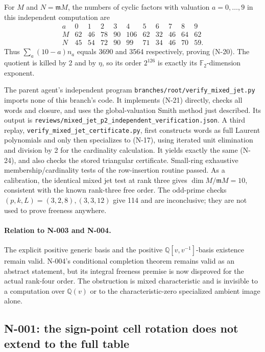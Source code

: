 For $M$ and $N=\mathfrak mM$, the numbers of cyclic factors with
valuation $a=0,\ldots,9$ in this independent computation are
\[
\begin{array}{c|rrrrrrrrrr}
a&0&1&2&3&4&5&6&7&8&9\\\hline
M&62&46&78&90&106&62&32&46&64&62\\
N&45&54&72&90&99&71&34&46&70&59.
\end{array}
\tag{N-24}
\]
Thus $\sum_a(10-a)n_a$ equals 3690 and 3564 respectively, proving
(N-20).  The quotient is killed by 2 and by $\eta$, so its order
$2^{126}$ is exactly its $\mathbb F_2$-dimension exponent.

The parent agent's independent program
\nolinkurl{branches/root/verify_mixed_jet.py} imports none of this
branch's code.  It implements (N-21) directly, checks all words and
closure, and uses the global-valuation Smith method just described.
Its output is
\nolinkurl{reviews/mixed_jet_p2_independent_verification.json}.
A third replay, \nolinkurl{verify_mixed_jet_certificate.py}, first
constructs words as full Laurent polynomials and only then specializes
to (N-17), using iterated unit elimination and division by 2 for the
cardinality calculation.  It yields exactly the same (N-24), and
also checks the stored triangular certificate.  Small-ring exhaustive
membership/cardinality tests of the row-insertion routine passed.
As a calibration, the identical mixed jet test at rank three gives
$\dim M/\mathfrak mM=10$, consistent with the known rank-three free
order.  The odd-prime checks $(p,k,L)=(3,2,8),(3,3,12)$ give 114 and
are inconclusive; they are not used to prove freeness anywhere.

\paragraph{Relation to N-003 and N-004.}
The explicit positive generic basis and the positive
$\mathbb Q[v,v^{-1}]$-basis existence remain valid.  N-004's conditional
completion theorem remains valid as an abstract statement, but its
integral freeness premise is now disproved for the actual rank-four
order.  The obstruction is mixed characteristic and is invisible to
a computation over $\mathbb Q(v)$ or to the characteristic-zero
specialized ambient image alone.

\subsection{N-001: the sign-point cell rotation does not extend to the full table}

